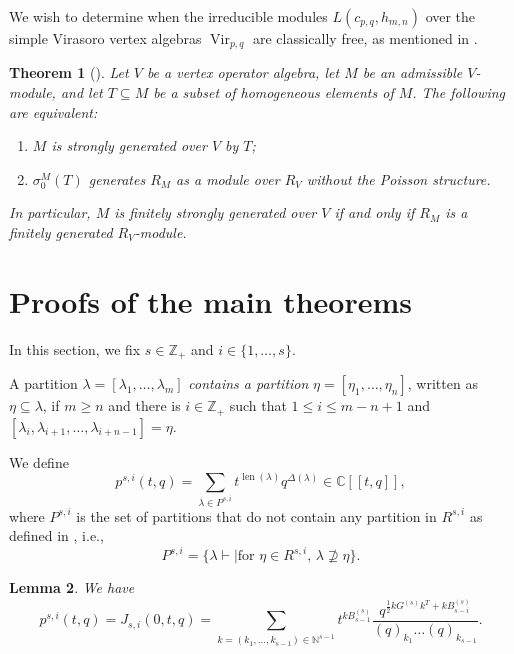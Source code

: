 \documentclass[a4paper, 12pt, reqno]{amsart}
\newtheorem{theorem}{Theorem}[section]
\newtheorem{lemma}[theorem]{Lemma}
\theoremstyle{remark}
\DeclareMathOperator{\Vir}{Vir}
\DeclareMathOperator{\len}{len}
\begin{document}
We wish to determine when the irreducible modules $L(c_{p, q}, h_{m, n})$ over the simple Virasoro vertex algebras $\Vir_{p, q}$ are classically free, as mentioned in .

\begin{theorem}[{\cite[Proposition 4.12]{li_abelianizing_2005}}]
  \label{thr:14}
  Let $V$ be a vertex operator algebra, let $M$ be an admissible $V$-module, and let $T \subseteq M$ be a subset of homogeneous elements of $M$.
  The following are equivalent:
  \begin{enumerate}
  \item $M$ is strongly generated over $V$ by $T$;
  \item $\sigma^M_0(T)$ generates $R_M$ as a module over $R_V$ without the Poisson structure.
  \end{enumerate}
  In particular, $M$ is finitely strongly generated over $V$ if and only if $R_M$ is a finitely generated $R_V$-module.
\end{theorem}

\section{Proofs of the main theorems}
\label{sec:proofs-main-theorems}

In this section, we fix $s \in \mathbb{Z}_+$ and $i \in \{1, \dots, s\}$.

A partition $\lambda = [\lambda_1, \dots, \lambda_m]$ \emph{contains a partition} $\eta = [\eta_1, \dots, \eta_n]$, written as $\eta \subseteq \lambda$, if $m \ge n$ and there is $i \in \mathbb{Z}_+$ such that $1 \le i \le m - n + 1$ and $[\lambda_i, \lambda_{i + 1}, \dots, \lambda_{i + n - 1}] = \eta$.

We define
\begin{equation*}
  p^{s, i}(t, q) = \sum_{\lambda \in P^{s, i}}t^{\len(\lambda)}q^{\Delta(\lambda)} \in \mathbb{C}[[t, q]],
\end{equation*}
where $P^{s, i}$ is the set of partitions that do not contain any partition in $R^{s, i}$ as defined in , i.e.,
\begin{equation*}
  P^{s, i} = \{\lambda \vdash \mid \text{for $\eta \in R^{s, i}$, $\lambda \nsupseteq \eta$}\}.
\end{equation*}

\begin{lemma}
  \label{lmm:9}
  We have
  \begin{equation*}
    p^{s, i}(t, q) = J_{s, i}(0, t, q) = \sum_{k = (k_1, \dots, k_{s - 1}) \in \mathbb{N}^{s - 1}}t^{kB^{(s)}_{s - 1}}\frac{q^{\frac{1}{2}kG^{(s)}k^T + kB^{(s)}_{s - i}}}{(q)_{k_1}\dots(q)_{k_{s - 1}}}.
  \end{equation*}
\end{lemma}
\end{document}
